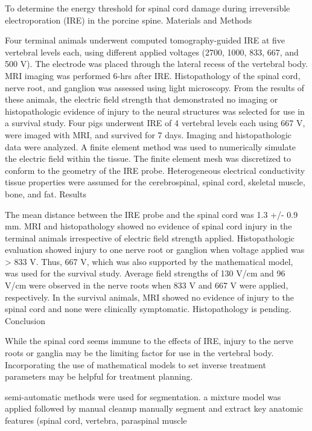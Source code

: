 \documentclass{article}
\begin{document}
To determine the energy threshold for spinal cord damage during irreversible
electroporation (IRE) in the porcine spine.
Materials and Methods

Four terminal animals underwent computed tomography-guided IRE at five
vertebral levels each, using different applied voltages (2700, 1000, 833,
667, and 500 V). The electrode was placed through the lateral recess of the
vertebral body. MRI imaging was performed 6-hrs after IRE. Histopathology of
the spinal cord, nerve root, and ganglion was assessed using light
microscopy. From the results of these animals, the electric field strength
that demonstrated no imaging or histopathologic evidence of injury to the
neural structures was selected for use in a survival study. Four pigs
underwent IRE of 4 vertebral levels each using 667 V, were imaged with MRI,
and survived for 7 days. Imaging and histopathologic data were analyzed. A
finite element method was used to numerically simulate the electric field
within the tissue. The finite element mesh was discretized to conform to the
geometry of the IRE probe. Heterogeneous electrical conductivity tissue
properties were assumed for the cerebrospinal, spinal cord, skeletal muscle,
bone, and fat.
Results

The mean distance between the IRE probe and the spinal cord was 1.3 +/- 0.9
mm. MRI and histopathology showed no evidence of spinal cord injury in the
terminal animals irrespective of electric field strength applied.
Histopathologic evaluation showed injury to one nerve root or ganglion when
voltage applied was > 833 V. Thus, 667 V, which was also supported by the
mathematical model, was used for the survival study. Average field strengths
of 130 V/cm and 96 V/cm were observed in the nerve roots when 833 V and 667
V were applied, respectively. In the survival animals, MRI showed no
evidence of injury to the spinal cord and none were clinically symptomatic.
Histopathology is pending.
Conclusion

While the spinal cord seems immune to the effects of IRE, injury to the
nerve roots or ganglia may be the limiting factor for use in the vertebral
body. Incorporating the use of mathematical models to set inverse treatment
parameters may be helpful for treatment planning.



semi-automatic methods were used for segmentation. 
a mixture model was applied followed by  manual cleanup
manually segment and
extract key anatomic features (spinal
cord, vertebra, paraspinal muscle
\end{document}

